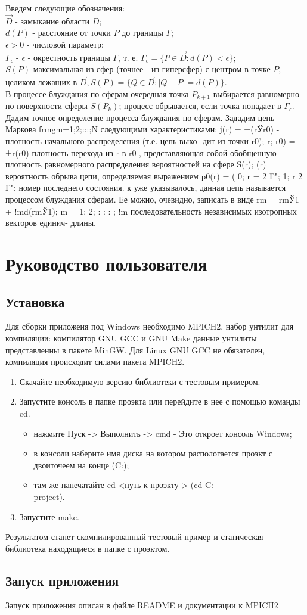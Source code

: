 Введем следующие обозначения:\\
$\vec{D}$  - замыкание области $D$;\\
$d(P)$ - расстояние от точки $P$ до границы $\Gamma$;\\
$\epsilon > 0 $ - числовой параметр;\\
$\Gamma_{\epsilon }$ - $\epsilon$ - окрестность границы $\Gamma$, т. е. $ \Gamma_{\epsilon }=\{ P \in \vec{D}:d(P) < \epsilon \} $;\\
$S(P)$  максимальная из сфер (точнее - из гиперсфер) с центром в точке $P$, целиком лежащих в $\vec{D}, S(P) = \{Q \in \vec{D}: |Q - P| = d(P)\}$.\\
В процессе блуждания по сферам очередная точка $P_{k+1}$ выбирается равномерно по поверхности сферы $S(P_{k})$; процесс обрывается, если точка попадает в $ \Gamma_{\epsilon }$.
Дадим точное определение процесса блуждания по сферам. Зададим цепь Маркова frmgm=1;2;:::;N следующими характеристиками:
ј(r) = ±(rЎr0) - плотность начального распределения (т.е. цепь выхо-
дит из точки r0);
r; r0) = ±r(r0)  плотность перехода из r в r0
, представляющая собой
обобщенную плотность равномерного распределения вероятностей
на сфере S(r);
(r)  вероятность обрыва цепи, определяемая выражением
p0(r) =
(
0; r = 2 Γ";
1; r 2 Γ";
 номер последнего состояния.
к уже указывалось, данная цепь называется процессом блуждания
сферам. Ее можно, очевидно, записать в виде
rm = rmЎ1 + !md(rmЎ1); m = 1; 2; : : : ;
!m  последовательность независимых изотропных векторов единич-
 длины.
\section{Руководство пользователя}
\subsection{Установка}
Для сборки приложеия под Windows необходимо MPICH2, набор унтилит для компиляции: компилятор GNU GCC и GNU Make данные унтилиты представленны в пакете MinGW. Для Linux GNU GCC не обязателен, компиляция происходит силами пакета MPICH2.
\begin{enumerate}
	\item Скачайте необходимую версию библиотеки с тестовым примером.
	\item Запустите консоль в папке проэкта или перейдите в нее с помощью команды cd.
	\begin{itemize}
		\item нажмите Пуск -> Выполнить -> cmd - Это откроет консоль Windows;
		\item в консоли наберите имя диска на котором распологается проэкт с двоиточеем на конце (C:);
		\item там же напечатайте cd <путь к проэкту > (cd C:\\project).
	\end{itemize}
	\item Запустите make.
\end{enumerate}
Результатом станет скомпилированный тестовый пример и статическая библиотека находящиеся в папке с проэктом.

\subsection{Запуск приложения}
Запуск приложения описан в файле README и документации к MPICH2 

